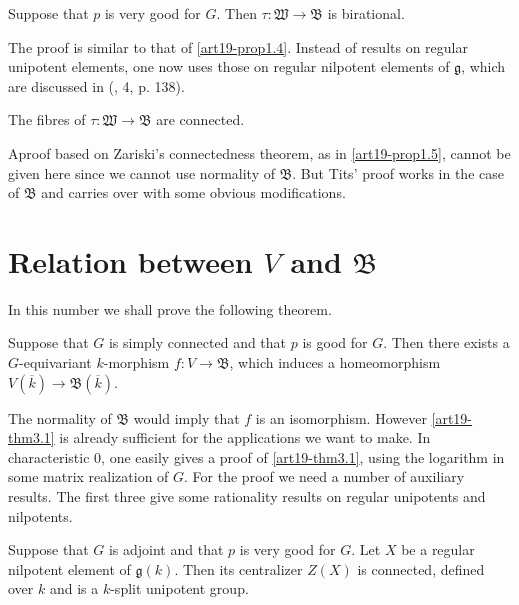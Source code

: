 \begin{proposition}\label{art19-prop2.4}
Suppose that $p$ is very good for $G$. Then $\tau :\mathfrak{W}\to \mathfrak{B}$ is birational.
\end{proposition}

The proof is similar to that of \ref{art19-prop1.4}. Instead of results on regular unipotent elements, one now uses those on regular nilpotent elements of $\mathfrak{g}$, which are discussed in (\cite{art19-key14}, 4, p. 138).

\begin{proposition}\label{art19-prop2.5}
The fibres of $\tau : \mathfrak{W}\to \mathfrak{B}$ are connected.
\end{proposition}

A\pageoriginale proof based on Zariski's connectedness theorem, as in \ref{art19-prop1.5}, cannot be given here since we cannot use normality of $\mathfrak{B}$. But Tits' proof works in the case of $\mathfrak{B}$ and carries over with some obvious modifications.

\section{Relation between \texorpdfstring{$V$}{V} and \texorpdfstring{$\mathfrak{B}$}{B}}\label{art19-sec3}

In this number we shall prove the following theorem.

\begin{theorem}\label{art19-thm3.1}
Suppose that $G$ is simply connected and that $p$ is good for $G$. Then there exists a $G$-equivariant $k$-morphism $f:V\to \mathfrak{B}$, which induces a homeomorphism $V(\overline{k})\to \mathfrak{B}(\overline{k})$.
\end{theorem}

The normality of $\mathfrak{B}$ would imply that $f$ is an isomorphism. However \ref{art19-thm3.1} is already sufficient for the applications we want to make. In characteristic $0$, one easily gives a proof of \ref{art19-thm3.1}, using the logarithm in some matrix realization of $G$. For the proof we need a number of auxiliary results. The first three give some rationality results on regular unipotents and nilpotents.

\begin{proposition}\label{art19-prop3.2}
Suppose that $G$ is adjoint and that $p$ is very good for $G$. Let $X$ be a regular nilpotent element of $\mathfrak{g}(k)$. Then its centralizer $Z(X)$ is connected, defined over $k$ and is a $k$-split unipotent group.
\end{proposition}

